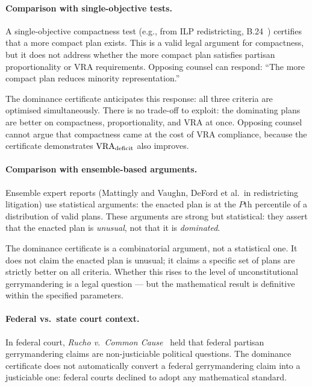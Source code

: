 \paragraph{Comparison with single-objective tests.}
A single-objective compactness test (e.g., from ILP redistricting,
B.24~\citep{dellaLibera2026ilp}) certifies that a more compact plan exists.
This is a valid legal argument for compactness, but it does not address whether
the more compact plan satisfies partisan proportionality or VRA requirements.
Opposing counsel can respond: ``The more compact plan reduces minority
representation.''

The dominance certificate anticipates this response: all three criteria are
optimised simultaneously.
There is no trade-off to exploit: the dominating plans are better on
compactness, proportionality, and VRA at once.
Opposing counsel cannot argue that compactness came at the cost of VRA
compliance, because the certificate demonstrates $\mathrm{VRA}_{\mathrm{deficit}}$ also improves.

\paragraph{Comparison with ensemble-based arguments.}
Ensemble expert reports (Mattingly and Vaughn, DeFord et al.\ in redistricting
litigation) use statistical arguments: the enacted plan is at the $P$th
percentile of a distribution of valid plans.
These arguments are strong but statistical: they assert that the enacted plan
is \emph{unusual}, not that it is \emph{dominated}.

The dominance certificate is a combinatorial argument, not a statistical one.
It does not claim the enacted plan is unusual; it claims a specific set of
plans are strictly better on all criteria.
Whether this rises to the level of unconstitutional gerrymandering is a
legal question --- but the mathematical result is definitive within the
specified parameters.

\paragraph{Federal vs.\ state court context.}
In federal court, \textit{Rucho v.\ Common Cause}~\citep{rucho2019} held that
federal partisan gerrymandering claims are non-justiciable political questions.
The dominance certificate does not automatically convert a federal gerrymandering
claim into a justiciable one: federal courts declined to adopt any mathematical
standard.

